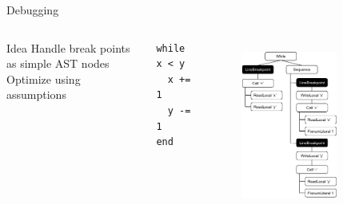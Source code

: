 \documentclass[xcolor=dvipsname]{beamer}
\newcommand{\idea}[1]{$\rightarrow$ #1}
\begin{document}
\begin{frame}[fragile]{Debugging}
  \begin{columns}[T]
      \begin{block}{Idea}
        Handle break points as simple AST nodes \\ Optimize using assumptions
      \end{block}

      \begin{lstlisting}
while x < y
  x += 1
  y -= 1
end
      \end{lstlisting}

      \begin{figure}
        \centering
        \includegraphics[width=0.7\textwidth]{breakpoints-crop.pdf}
        \label{fig:breakpoints}
      \end{figure}
  \end{columns}






\end{frame}
\end{document}

